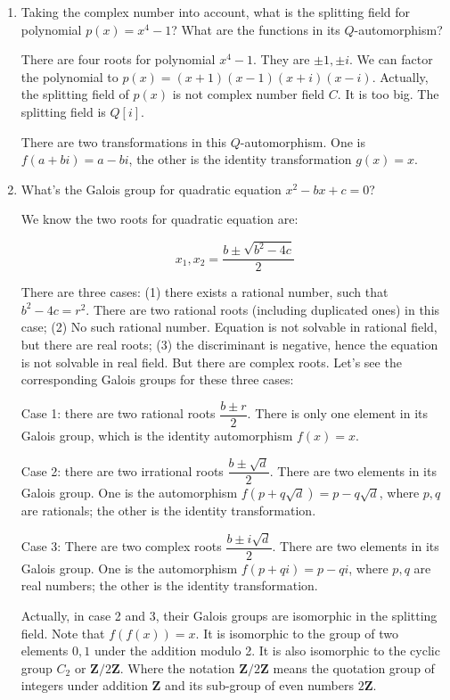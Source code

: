 \documentclass[UTF8]{article}
\begin{document}
\begin{enumerate}
\item{Taking the complex number into account, what is the splitting field for polynomial $p(x) = x^4-1$? What are the functions in its $Q$-automorphism?}

There are four roots for polynomial $x^4 -1$. They are $\pm 1, \pm i$. We can factor the polynomial to $p(x) = (x + 1)(x - 1)(x + i)( x - i)$. Actually, the splitting field of $p(x)$ is not complex number field $C$. It is too big. The splitting field is $Q[i]$.

There are two transformations in this $Q$-automorphism. One is $f(a + bi) = a - bi$, the other is the identity transformation $g(x) = x$.

\item{What's the Galois group for quadratic equation $x^2 - bx + c = 0$?}

We know the two roots for quadratic equation are:

\[
x_1, x_2 = \dfrac{b \pm \sqrt{b^2 - 4c}}{2}
\]

There are three cases: (1) there exists a rational number, such that $b^2 - 4c = r^2$. There are two rational roots (including duplicated ones) in this case; (2) No such rational number. Equation is not solvable in rational field, but there are real roots; (3) the discriminant is negative, hence the equation is not solvable in real field. But there are complex roots. Let's see the corresponding Galois groups for these three cases:

Case 1: there are two rational roots $\dfrac{b \pm r}{2}$. There is only one element in its Galois group, which is the identity automorphism $f(x) = x$.

Case 2: there are two irrational roots $\dfrac{b \pm \sqrt{d}}{2}$. There are two elements in its Galois group. One is the automorphism $f(p + q \sqrt{d}) = p - q \sqrt{d}$, where $p, q$ are rationals; the other is the identity transformation.

Case 3: There are two complex roots $\dfrac{b \pm i \sqrt{d}}{2}$. There are two elements in its Galois group. One is the automorphism $f(p + q i) = p - q i$, where $p, q$ are real numbers; the other is the identity transformation.

Actually, in case 2 and 3, their Galois groups are isomorphic in the splitting field. Note that $f(f(x)) = x$. It is isomorphic to the group of two elements ${0, 1}$ under the addition modulo 2. It is also isomorphic to the cyclic group $C_2$ or $\pmb{Z}/2\pmb{Z}$. Where the notation $\pmb{Z}/2\pmb{Z}$ means the quotation group of integers under addition $\pmb{Z}$ and its sub-group of even numbers $2\pmb{Z}$.


\end{enumerate}
\end{document}
